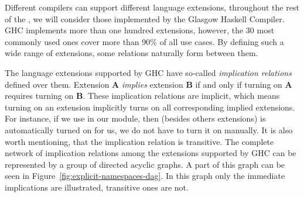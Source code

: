 \documentclass[main.tex]{subfiles}
\begin{document}
	
	Different compilers can support different language extensions, throughout the rest of the \paper{}, we will consider those implemented by the Glasgow Haskell Compiler. GHC implements more than one hundred extensions, however, the 30 most commonly used ones cover more than 90\% of all use cases. By defining such a wide range of extensions, some relations naturally form between them.
	
	The language extensions supported by GHC have so-called \emph{implication relations} defined over them. Extension \textbf{A} \emph{implies} extension \textbf{B} if and only if turning on \textbf{A} requires turning on \textbf{B}. These implication relations are implicit, which means turning on an extension implicitly turns on all corresponding implied extensions. For instance, if we use  in our module, then (besides others extensions)  is automatically turned on for us, we do not have to turn it on manually. It is also worth mentioning, that the implication relation is transitive. The complete network of implication relations among the extensions supported by GHC can be represented by a group of directed acyclic graphs. A part of this graph can be seen in Figure~\ref{fig:explicit-namespaces-dag}. In this graph only the immediate implications are illustrated, transitive ones are not.
	
	
	
	
\end{document}
